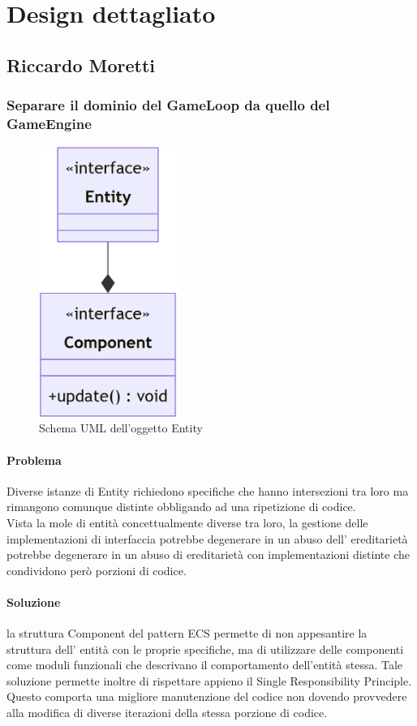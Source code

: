 \documentclass[a4paper,12pt]{report}
\begin{document}
\section{Design dettagliato}
%
\subsection*{Riccardo Moretti}
%
\subsubsection*{Separare il dominio del GameLoop da quello del GameEngine}
%
\begin{figure}[H]
    \centering{}
    \includegraphics[width=0.4\textwidth]{img/UMLEntita.png}
    \caption{Schema UML dell'oggetto Entity}
\end{figure}
%
\paragraph*{Problema} Diverse istanze di Entity richiedono specifiche che hanno intersezioni tra loro ma rimangono comunque distinte obbligando ad una ripetizione di codice.
\\
Vista la mole di entità concettualmente diverse tra loro, la gestione delle implementazioni di interfaccia potrebbe degenerare in un abuso dell’ ereditarietà potrebbe degenerare in un abuso di ereditarietà con implementazioni distinte che condividono però porzioni di codice.
%
\paragraph*{Soluzione} la struttura Component del pattern ECS permette di non appesantire la struttura dell’ entità con le proprie specifiche, ma di utilizzare delle componenti come moduli funzionali che descrivano il comportamento dell’entità stessa.
Tale soluzione permette inoltre di rispettare appieno il Single Responsibility Principle. Questo comporta una migliore manutenzione del codice non dovendo provvedere alla modifica di diverse iterazioni della stessa porzione di codice.
\end{document}
